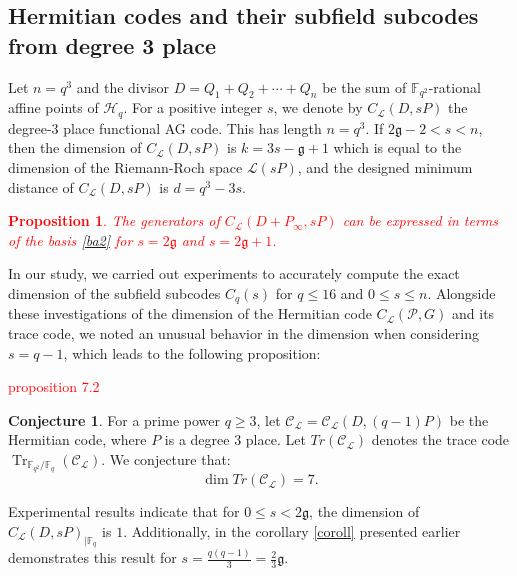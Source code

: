 \documentclass[a4paper]{amsart}
\theoremstyle{plain}
\newtheorem{proposition}[theorem]{Proposition}
\theoremstyle{definition}
\newtheorem{conjecture}{Conjecture}[section]
\theoremstyle{remark}
\newcommand{\g}{\mathfrak{g}}
\DeclareMathOperator{\trace}{Tr}
\newcommand{\calL}{\mathcal{L}}
\newcommand{\calC}{\mathcal{C}}
\begin{document}
\subsection{Hermitian codes and their subfield subcodes from degree 3 place}
Let $n=q^3$ and the divisor $D=Q_1+Q_2+\cdots+Q_n$ be the sum of $\mathbb{F}_{q^2}$-rational affine points of $\mathscr{H}_q$. For a positive integer $s$, we denote by $C_{\calL}(D,sP)$ the degree-3 place functional AG code. This has length $n=q^3$. If $2 \mathfrak{g}-2<s<n$, then the dimension of $C_{\calL}(D,sP)$ is $k=3s-\mathfrak{g}+1$ which is equal to the dimension of the Riemann-Roch space $\mathscr{L}\left(s P\right)$, and  the designed minimum distance of $C_{\calL}(D,sP)$ is $d=q^3-3s$.

\textcolor{red}{\begin{proposition}
	The generators of $C_{\mathcal{L}}\left(D+P_{\infty}, s P\right)$ can be expressed in terms of the basis \ref{ba2} for $s=2 \g$ and $s=2 \g+1$.
\end{proposition}}

In our study, we carried out experiments to accurately compute the exact dimension of the subfield subcodes $ C_{q}(s) $ for $ q \leq 16 $ and $0 \leq s \leq n$. Alongside these investigations of the dimension of the Hermitian code $ C_{\mathcal{L}}(\mathcal{P}, G) $ and its trace code, we noted an unusual behavior in the dimension when considering $s = q - 1 $, which leads to the following proposition:


\textcolor{red}{proposition 7.2 }







\begin{conjecture} 
	For a prime power $q \geq 3$, let  $\calC_{\mathcal{L}}=\calC_{\mathcal{L}}( D, (q-1)P)$ be the Hermitian code, where $P$ is a degree 3 place. Let $Tr(\calC_{\mathcal{L}})$ denotes the trace code $\trace_{\mathbb{F}_{q^2} / \mathbb{F}_q}(\calC_{\mathcal{L}})$. We conjecture that:
	\[\dim Tr(\calC_{\mathcal{L}}) = 7 .\]
\end{conjecture}


Experimental results indicate that for $0 \leq s < 2\mathfrak{g}$, the dimension of $C_{\mathcal{L}}(D,sP)_{\mid \mathbb{F}_q}$ is $1$. Additionally, in the corollary \ref{coroll} presented earlier demonstrates this result for $ s =\frac{q(q-1)}{3}=\frac{2}{3} \g$.
\end{document}
